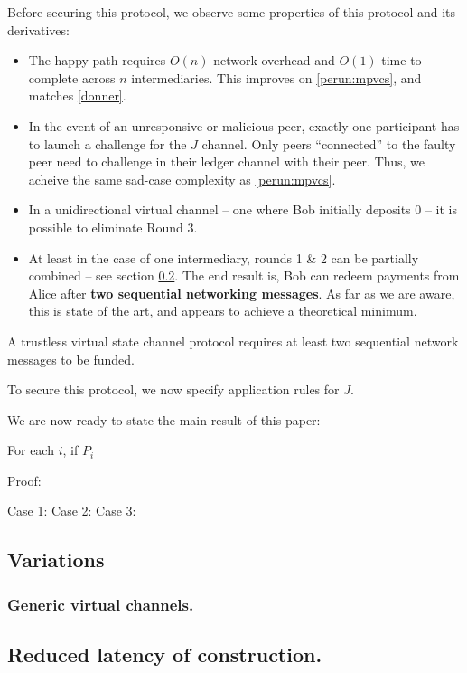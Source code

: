 Before securing this protocol, we observe some properties of this protocol and its derivatives:
\begin{itemize}
    \item The happy path requires $O(n)$ network overhead and $O(1)$ time to complete across $n$ intermediaries. This improves on \ref{perun:mpvcs}, and matches \ref{donner}. 
    \item In the event of an unresponsive or malicious peer, exactly one participant has to launch a challenge for the $J$ channel. Only peers ``connected'' to the faulty peer need to challenge in their ledger channel with their peer. Thus, we acheive the same sad-case complexity as \ref{perun:mpvcs}.
    \item In a unidirectional virtual channel -- one where Bob initially deposits 0 -- it is possible to eliminate Round 3. 
    \item At least in the case of one intermediary, rounds 1 \& 2 can be partially combined -- see section \ref{sec:optimization}. The end result is, Bob can redeem payments from Alice after \textbf{two sequential networking messages}. As far as we are aware, this is state of the art, and appears to achieve a theoretical minimum.
\end{itemize}
\begin{conjecture}
    A trustless virtual state channel protocol requires at least two sequential network messages to be funded.
\end{conjecture}

To secure this protocol, we now specify application rules for $J$. 


We are now ready to state the main result of this paper:
\begin{theorem}
    For each $i$, if $P_i$ 
\end{theorem}

Proof: 

Case 1:
Case 2:
Case 3:


\subsection{Variations}

\subsubsection{Generic virtual channels.}

\subsection{Reduced latency of construction.}\label{sec:optimization}
\todo{}
